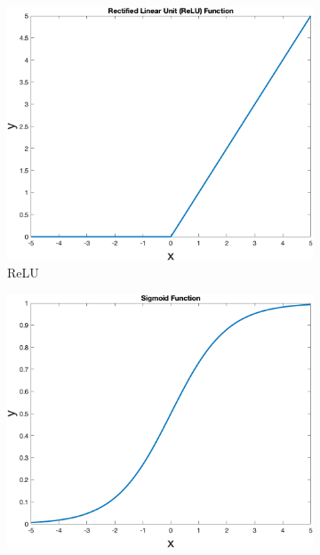     \begin{figure}[!ht]
        \centering
        \begin{subfigure}[b]{0.3\textwidth}
            \includegraphics[width=\textwidth]{figures/relu}
            \caption{ReLU}
            \label{fig:relu}
        \end{subfigure}
        \hspace{0.1\textwidth}
        \begin{subfigure}[b]{0.3\textwidth}
            \includegraphics[width=\textwidth]{figures/sigmoid}

\end{subfigure}
\end{figure}
